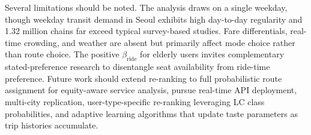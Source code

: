 Several limitations should be noted. The analysis draws on a single weekday,
though weekday transit demand in Seoul exhibits high day-to-day regularity and
1.32 million chains far exceed typical survey-based studies. Fare
differentials, real-time crowding, and weather are absent but primarily affect
mode choice rather than route choice. The positive $\beta_{\mathrm{ride}}$ for
elderly users invites complementary stated-preference research to disentangle
seat availability from ride-time preference. Future work should extend
re-ranking to full probabilistic route assignment for equity-aware service
analysis, pursue real-time API deployment, multi-city replication,
user-type-specific re-ranking leveraging LC class probabilities, and adaptive
learning algorithms that update taste parameters as trip histories accumulate.
